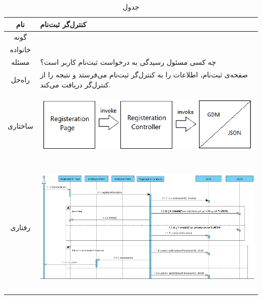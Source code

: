 \begin{table}[H]
	\begin{adjustbox}{width=\textwidth}
		\begin{tabular}{|c|p{\textwidth}|}
			\hline
			نام &
			کنترل‌گر ثبت‌نام \\ 
			\hline
			گونه & 
			\grasp \\
			\hline
			خانواده &
			\controller \\
			\hline
			مسئله & 
			چه کسی مسئول رسیدگی به درخواست ثبت‌نام کاربر است؟\\
			\hline
			راه‌حل& 
			صفحه‌ی ثبت‌نام، اطلاعات را به کنترل‌گر ثبت‌‌نام می‌فرستد و نتبجه‌ را از کنترل‌گر دریافت می‌کند. \\
			\hline
			ساختاری & 
			\begin{minipage}{\textwidth}
				\begin{flushleft}
					\begin{minipage}{\textwidth}
						\includegraphics[width=13cm, height=2.7cm]{./images/7-7-1}
					\end{minipage}
				\end{flushleft}
			\end{minipage}
			
			\\
			\hline
			رفتاری & 
			\begin{minipage}{\textwidth}
				\begin{flushleft}
					\begin{minipage}{\textwidth}
						\includegraphics[width=13.5cm, height=6cm]{./images/7-7-2}
					\end{minipage}
				\end{flushleft}
			\end{minipage}
			\\
			\hline
		\end{tabular}
	\end{adjustbox}
	\caption{جدول }
	\label{table-with-pic:7}
\end{table}
